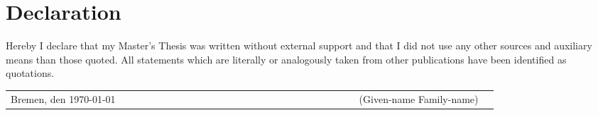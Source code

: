 \chapter*{Declaration}
\thispagestyle{empty}
Hereby I declare that my Master's Thesis was written without external support and that I did not use any other sources and auxiliary means than those quoted. All statements which are literally or analogously taken from other publications have been identified as quotations.


\vspace{2cm}
\begin{table}[h]
\begin{flushleft}
		\begin{tabular}{l c r}
		\cline{3-3}   
			Bremen, den \today{} & ~~~~~~~~~~~~~~~~~~~~~~~~~~~~~~~~~~~~~~~~~~~&~~(Given-name Family-name)~~\\   
		\end{tabular}
		\end{flushleft}
\end{table}
